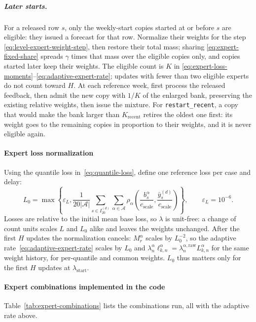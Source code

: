 \documentclass[11pt,a4paper]{article}
\newcommand{\A}{\mathcal{A}}
\theoremstyle{definition}
\theoremstyle{remark}
\begin{document}
\subparagraph{Later starts.}
For a released row $s$, only the weekly-start copies started at or before
$s$ are eligible: they issued a forecast for that row. Normalize their
weights for the step \eqref{eq:level-expert-weight-step}, then restore
their total mass; sharing \eqref{eq:expert-fixed-share} spreads $\gamma$
times that mass over the eligible copies only, and copies started later
keep their weights. The eligible count is $K$ in
\eqref{eq:expert-loss-moments}--\eqref{eq:adaptive-expert-rate}; updates
with fewer than two eligible experts do not count toward $H$. At each
reference week, first process the released feedback, then admit the new
copy with $1/K$ of the enlarged bank, preserving the existing relative
weights, then issue the mixture. For \texttt{restart\_recent}, a copy that
would make the bank larger than $K_{\mathrm{recent}}$ retires the oldest
one first: its weight goes to the remaining copies in proportion to their
weights, and it is never eligible again.

\paragraph{Expert loss normalization}
\label{sec:expert-loss-normalization}
Using the quantile loss in~\eqref{eq:quantile-loss}, define one reference loss
per case and delay:
\begin{equation}
 L_0=\max\!\left\{\varepsilon_L,
 \frac{1}{20|\A|}\sum_{s\in I_{20}^{(d)}}\sum_{\alpha\in\A}
 \rho_\alpha\!\left(\frac{b_s^\alpha}{c_{\mathrm{scale}}},
                    \frac{\bar y_s^{(d)}}{c_{\mathrm{scale}}}\right)\right\},
 \qquad\varepsilon_L=10^{-6}.
 \label{eq:expert-reference-loss}
\end{equation}
Losses are relative to the initial mean base loss, so $\lambda$ is
unit-free: a change of count units scales $L$ and $L_0$ alike and leaves
the weights unchanged. After the first $H$ updates the normalization
cancels: $M_r^\alpha$ scales by $L_0^{-2}$, so the adaptive
rate~\eqref{eq:adaptive-expert-rate} scales by $L_0$ and
$\lambda_n^\alpha\ell_{k,n}^\alpha=\lambda_n^{\alpha,\mathrm{raw}}L_{k,n}^\alpha$
for the same weight history, for per-quantile and
common weights. $L_0$ thus matters only for the first $H$ updates at
$\lambda_{\mathrm{start}}$.

\paragraph{Expert combinations implemented in the code}
\label{sec:expert-combinations}
\label{sec:phase-specific-experts}
\label{sec:shared-quantile-weights}
Table~\ref{tab:expert-combinations} lists the combinations run, all with the
adaptive rate above.
\end{document}
